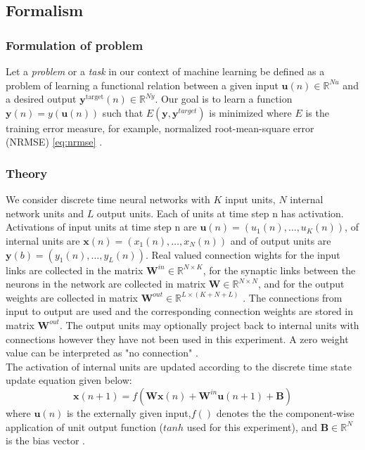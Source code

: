  
 
  \subsection{Formalism}
  \subsubsection{Formulation of problem}
    Let a \textit{problem} or a \textit{task} in our context of machine learning be defined as a problem of learning  a functional relation between a given input  $\mathbf{u}(n)\in \mathbb{R}^{Nu}$ and a desired output $\mathbf{y}^{\text{target}}(n) \in \mathbb{R}^{Ny}$. Our goal is to learn a function $\mathbf{y}(n) = y(\mathbf{u}(n))$ such that $E(\mathbf{y}, \mathbf{y}^{target})$ is minimized where $E$ is the training error measure, for example, normalized root-mean-square error (NRMSE) \eqref{eq:nrmse} \cite{reservoirComputing}.
    \\
	\subsubsection{Theory}
  We consider discrete time neural networks with $K$ input units, $N$ internal network units and $L$ output units. Each of units at time step n has activation. Activations of input units at time step n are $\mathbf{u}(n) = (u_1(n),\hdots,u_K(n))$, of internal units are $\mathbf{x}(n) =( x_1(n),\hdots,x_N(n) )$ and of output units are $\mathbf{y}(b) = (y_1(n),\hdots,y_L(n))$. Real valued connection wights for the input links are collected in the matrix $\mathbf{W}^{in} \in \mathbb{R}^{N \times K }$, for the synaptic links between the neurons in the network are collected in matrix $\mathbf{W} \in \mathbb{R}^{N \times N }$, and for the output weights are collected in matrix $\mathbf{W}^{out} \in \mathbb{R}^{L \times (K+N+L) }$ \cite{EchoStatesTechRep}. The connections from input to output are used and the corresponding connection weights are stored in matrix $\mathbf{W}^{out}$. The output units may optionally project back to internal units with connections however they have not been used in this experiment. A zero weight value can be interpreted as "no connection" \cite{Jaeger_TrainingRNNsTutorial.2005}. \\
  \indent \indent
  The activation of internal units are updated according to the discrete time state update equation given below:
   \begin{equation} \label{eq:stateUpdate}
    \textbf{x}(n+1) = f(\textbf{Wx}(n) +  \textbf{W}^{in}\textbf{u}(n+1) + \mathbf{B} )
  \end{equation}
   where $\mathbf{u}(n)$ is the externally given input,$f()$ denotes the the component-wise application of unit output function ($tanh$ used for this experiment), and $\mathbf{B} \in \mathbb{R}^N$ is the bias vector .
 
